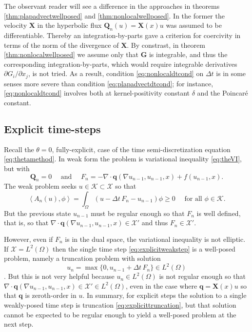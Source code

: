 \documentclass[final,leqno,onefignum,onetabnum]{siamltex1213bueler}
\newcommand\bG{\mathbf{G}}
\newcommand\bq{\mathbf{q}}
\newcommand\bQ{\mathbf{Q}}
\newcommand\bX{\mathbf{X}}
\newcommand{\Div}{\nabla\cdot}
\renewcommand{\grad}{\nabla}
\newcommand{\ip}[2]{\ensuremath{\left<#1,#2\right>}}
\begin{document}
The observant reader will see a difference in the approaches in theorems \ref{thm:plapadvectwellposed} and \ref{thm:nonlocalwellposed}.  In the former the velocity $\bX$ in the hyperbolic flux $\bQ_n(u) = \bX(x) u$ was assumed to be differentiable.  Thereby an integration-by-parts gave a criterion for coercivity in terms of the norm of the divergence of $\bX$.  By constrast, in theorem \ref{thm:nonlocalwellposed} we assume only that $\bG$ is integrable, and thus the corresponding integration-by-parts, which would require integrable derivatives $\partial G_i/\partial x_j$, is not tried.  As a result, condition \eqref{eq:nonlocaldtcond} on $\Delta t$ is in some senses more severe than condition \eqref{eq:plapadvectdtcond}; for instance, \eqref{eq:nonlocaldtcond} involves both at kernel-positivity constant $\delta$ and the Poincar\'e constant.

\subsection{Explicit time-steps} \label{subsec:explicit}  Recall the $\theta=0$, fully-explicit, case of the time semi-discretization equation \eqref{eq:thetamethod}.  In weak form the problem is variational inequality \eqref{eq:theVI}, but with
    $$\bQ_n=0 \quad \text{ and } \quad F_n = - \Div \bq(\grad u_{n-1},u_{n-1},x) + f(u_{n-1},x).$$
The weak problem seeks $u\in\mathcal{K} \subset \mathcal{X}$ so that
\begin{equation}
\ip{A_n(u)}{\phi} = \int_\Omega (u - \Delta t\,F_n - u_{n-1})\phi \ge 0 \quad \text{ for all } \phi \in \mathcal{K}.  \label{eq:explicitweakstep}
\end{equation}
But the previous state $u_{n-1}$ must be regular enough so that $F_n$ is well defined, that is, so that $\Div \bq(\grad u_{n-1},u_{n-1},x) \in \mathcal{X}'$ and thus $F_n\in\mathcal{X}'$.

However, even if $F_n$ is in the dual space, the variational inequality is not elliptic.  If $\mathcal{X}=L^2(\Omega)$ then the single time step \eqref{eq:explicitweakstep} is a well-posed problem, namely a truncation problem with solution
\begin{equation}
u_n = \max\{0,u_{n-1} + \Delta t\,F_n\} \in L^2(\Omega)  \label{eq:explicittruncation}
\end{equation}
\cite[page 27]{KinderlehrerStampacchia1980}.  But this is not very helpful because $u_n \in L^2(\Omega)$ is not regular enough so that $\Div \bq(\grad u_{n-1},u_{n-1},x) \in \mathcal{X}' \in L^2(\Omega)$, even in the case where $\bq = \bX(x) u$ so that $\bq$ is zeroth-order in $u$.  In summary, for explicit steps the solution to a single weakly-posed time step is truncation \eqref{eq:explicittruncation}, but that solution cannot be expected to be regular enough to yield a well-posed problem at the next step.
\end{document}
